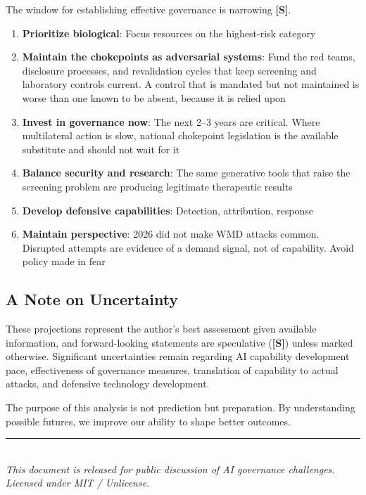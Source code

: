 \documentclass[11pt,letterpaper]{article}
\begin{document}
The window for establishing effective governance is narrowing \textbf{[S]}.

\begin{contextbox}
\begin{enumerate}
  \item \textbf{Prioritize biological}: Focus resources on the highest-risk category
  \item \textbf{Maintain the chokepoints as adversarial systems}: Fund the red teams, disclosure processes, and revalidation cycles that keep screening and laboratory controls current. A control that is mandated but not maintained is worse than one known to be absent, because it is relied upon
  \item \textbf{Invest in governance now}: The next 2--3 years are critical. Where multilateral action is slow, national chokepoint legislation is the available substitute and should not wait for it
  \item \textbf{Balance security and research}: The same generative tools that raise the screening problem are producing legitimate therapeutic results
  \item \textbf{Develop defensive capabilities}: Detection, attribution, response
  \item \textbf{Maintain perspective}: 2026 did not make WMD attacks common. Disrupted attempts are evidence of a demand signal, not of capability. Avoid policy made in fear
\end{enumerate}
\end{contextbox}

\subsection{A Note on Uncertainty}

These projections represent the author's best assessment given available information, and forward-looking statements are speculative (\textbf{[S]}) unless marked otherwise. Significant uncertainties remain regarding AI capability development pace, effectiveness of governance measures, translation of capability to actual attacks, and defensive technology development.

The purpose of this analysis is not prediction but preparation. By understanding possible futures, we improve our ability to shape better outcomes.

\vspace{0.5cm}
\begin{center}
\textcolor{softslate}{\rule{6cm}{0.5pt}}\\[0.5cm]
\textit{This document is released for public discussion of AI governance challenges.}\\[0.3cm]
\textit{Licensed under MIT / Unlicense.}
\end{center}
\end{document}
